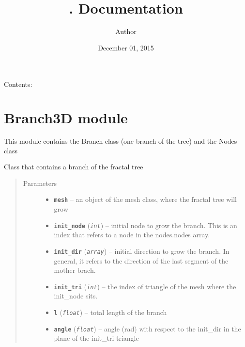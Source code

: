 \documentclass[letterpaper,10pt,english]{sphinxmanual}
\title{. Documentation}
\date{December 01, 2015}
\author{Author}
\begin{document}
\maketitle
\tableofcontents
{}\label{index::doc}


Contents:


\chapter{Branch3D module}
\label{Branch3D:branch3d-module}\label{Branch3D::doc}\label{Branch3D:welcome-to-s-documentation}\label{Branch3D:module-Branch3D}
This module contains the Branch class (one branch of the tree)  and the Nodes class

\begin{fulllineitems}
\label{Branch3D:Branch3D.Branch}
Class that contains a branch of the fractal tree
\begin{quote}\begin{description}
\item[{Parameters}] \leavevmode\begin{itemize}
\item {} 
\textbf{\texttt{mesh}} -- an object of the mesh class, where the fractal tree will grow

\item {} 
\textbf{\texttt{init\_node}} (\emph{\texttt{int}}) -- initial node to grow the branch. This is an index that refers to a node in the nodes.nodes array.

\item {} 
\textbf{\texttt{init\_dir}} (\emph{\texttt{array}}) -- initial direction to grow the branch. In general, it refers to the direction of the last segment of the mother brach.

\item {} 
\textbf{\texttt{init\_tri}} (\emph{\texttt{int}}) -- the index of triangle of the mesh where the init\_node sits.

\item {} 
\textbf{\texttt{l}} (\emph{\texttt{float}}) -- total length of the branch

\item {} 
\textbf{\texttt{angle}} (\emph{\texttt{float}}) -- angle (rad) with respect to the init\_dir in the plane of the init\_tri triangle


\end{itemize}
\end{description}
\end{quote}
\end{fulllineitems}
\end{document}
